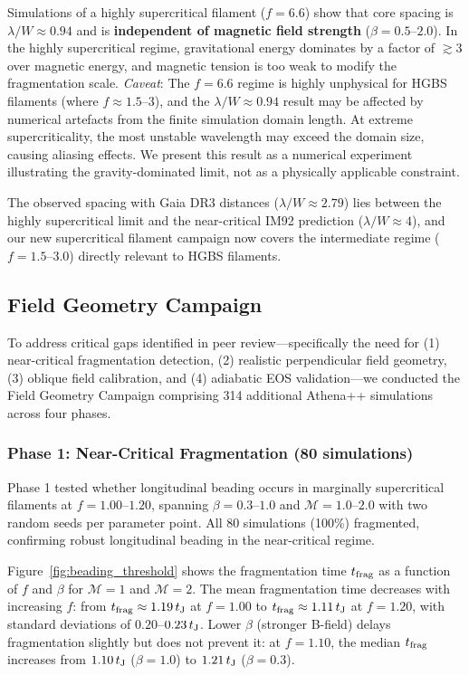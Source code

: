 \documentclass[twoside,twocolumn]{mnras}
\begin{document}
Simulations of a highly supercritical filament ($f = 6.6$) show that core spacing is $\lambda/W \approx 0.94$ and is \textbf{independent of magnetic field strength} ($\beta = 0.5$--$2.0$). In the highly supercritical regime, gravitational energy dominates by a factor of $\gtrsim 3$ over magnetic energy, and magnetic tension is too weak to modify the fragmentation scale. \textit{Caveat}: The $f = 6.6$ regime is highly unphysical for HGBS filaments (where $f \approx 1.5$--$3$), and the $\lambda/W \approx 0.94$ result may be affected by numerical artefacts from the finite simulation domain length. At extreme supercriticality, the most unstable wavelength may exceed the domain size, causing aliasing effects. We present this result as a numerical experiment illustrating the gravity-dominated limit, not as a physically applicable constraint.

The observed spacing with Gaia DR3 distances ($\lambda/W \approx 2.79$) lies between the highly supercritical limit and the near-critical IM92 prediction ($\lambda/W \approx 4$), and our new supercritical filament campaign now covers the intermediate regime ($f = 1.5$--$3.0$) directly relevant to HGBS filaments.

\subsection{Field Geometry Campaign}
\label{sec:fieldgeo}

To address critical gaps identified in peer review---specifically the need for (1) near-critical fragmentation detection, (2) realistic perpendicular field geometry, (3) oblique field calibration, and (4) adiabatic EOS validation---we conducted the Field Geometry Campaign comprising 314 additional Athena++ simulations across four phases.

\subsubsection{Phase 1: Near-Critical Fragmentation (80 simulations)}

Phase 1 tested whether longitudinal beading occurs in marginally supercritical filaments at $f = 1.00$--$1.20$, spanning $\beta = 0.3$--$1.0$ and $\mathcal{M} = 1.0$--$2.0$ with two random seeds per parameter point. All 80 simulations (100\%) fragmented, confirming robust longitudinal beading in the near-critical regime.

Figure~\ref{fig:beading_threshold} shows the fragmentation time $t_{\rm frag}$ as a function of $f$ and $\beta$ for $\mathcal{M} = 1$ and $\mathcal{M} = 2$. The mean fragmentation time decreases with increasing $f$: from $t_{\rm frag} \approx 1.19\,t_{\rm J}$ at $f = 1.00$ to $t_{\rm frag} \approx 1.11\,t_{\rm J}$ at $f = 1.20$, with standard deviations of $0.20$--$0.23\,t_{\rm J}$. Lower $\beta$ (stronger B-field) delays fragmentation slightly but does not prevent it: at $f = 1.10$, the median $t_{\rm frag}$ increases from $1.10\,t_{\rm J}$ ($\beta = 1.0$) to $1.21\,t_{\rm J}$ ($\beta = 0.3$).
\end{document}

